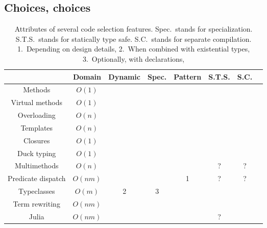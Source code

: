 \subsection{Choices, choices}
\label{sec:choices}

\newcommand{\chk}{{\Large \checkmark}}

\begin{table}[!t]
\begin{center}
\begin{tabular}{|c||c|c|c|c|c|c|c|}
\hline
               & Domain &  Dynamic  & Spec. & Pattern & S.T.S. & S.C. \\
\hline
\hline
Methods        & $O(1)$   &         &       &         & \chk   & \chk \\
\hline
Virtual methods  & $O(1)$   & \chk    &       &         & \chk   & \chk \\
\hline
Overloading    & $O(n)$   &         &       &         & \chk   & \chk \\
\hline
Templates      & $O(n)$   &         & \chk  &         & \chk   &      \\
\hline
Closures       & $O(1)$   & \chk    &       &         & \chk   & \chk \\
\hline
Duck typing    & $O(1)$   & \chk    &       &         &        & \chk \\
\hline
Multimethods   & $O(n)$   & \chk    &       &         & ?      & ?    \\
\hline
Predicate dispatch & $O(n m)$ & \chk    &       &  \small{1}  & ? & ? \\
\hline
Typeclasses    & $O(m)$   & \small{2} & \small{3} &   & \chk   & \chk \\
\hline
Term rewriting & $O(n m)$ & \chk    &       & \chk    &        &      \\
\hline
Julia          & $O(n m)$ & \chk    & \chk  &         & ?      &      \\
\hline
\end{tabular}
\end{center}
\begin{singlespace}
\caption[Attributes of code selection features]{
\small{
Attributes of several code selection features.
Spec.\ stands for specialization.
S.T.S.\ stands for statically type safe.
S.C.\ stands for separate compilation.
1.\ Depending on design details, 2.\ When combined with existential types,
3.\ Optionally, with declarations,
}
}
\label{table:dispatch}
\end{singlespace}
\end{table}

